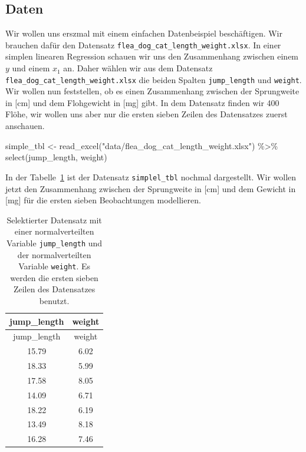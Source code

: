 \documentclass[
  letterpaper,
]{scrbook}
\newenvironment{Shaded}{\begin{snugshade}}{\end{snugshade}}
\newcommand{\FunctionTok}[1]{\textcolor[rgb]{0.28,0.35,0.67}{#1}}
\newcommand{\NormalTok}[1]{\textcolor[rgb]{0.00,0.23,0.31}{#1}}
\newcommand{\OtherTok}[1]{\textcolor[rgb]{0.00,0.23,0.31}{#1}}
\newcommand{\SpecialCharTok}[1]{\textcolor[rgb]{0.37,0.37,0.37}{#1}}
\newcommand{\StringTok}[1]{\textcolor[rgb]{0.13,0.47,0.30}{#1}}
\begin{document}
\hypertarget{daten-7}{%
\subsection{Daten}\label{daten-7}}

Wir wollen uns erszmal mit einem einfachen Datenbeispiel beschäftigen.
Wir brauchen dafür den Datensatz
\texttt{flea\_dog\_cat\_length\_weight.xlsx}. In einer simplen linearen
Regression schauen wir uns den Zusammenhang zwischen einem \(y\) und
einem \(x_1\) an. Daher wählen wir aus dem Datensatz
\texttt{flea\_dog\_cat\_length\_weight.xlsx} die beiden Spalten
\texttt{jump\_length} und \texttt{weight}. Wir wollen nun feststellen,
ob es einen Zusammenhang zwischen der Sprungweite in {[}cm{]} und dem
Flohgewicht in {[}mg{]} gibt. In dem Datensatz finden wir 400 Flöhe, wir
wollen uns aber nur die ersten sieben Zeilen des Datensatzes zuerst
anschauen.

\begin{Shaded}
\begin{Highlighting}[]
\NormalTok{simple\_tbl }\OtherTok{\textless{}{-}} \FunctionTok{read\_excel}\NormalTok{(}\StringTok{"data/flea\_dog\_cat\_length\_weight.xlsx"}\NormalTok{) }\SpecialCharTok{\%\textgreater{}\%}
  \FunctionTok{select}\NormalTok{(jump\_length, weight) }
\end{Highlighting}
\end{Shaded}

In der Tabelle~\ref{tbl-model-1} ist der Datensatz \texttt{simplel\_tbl}
nochmal dargestellt. Wir wollen jetzt den Zusammenhang zwischen der
Sprungweite in {[}cm{]} und dem Gewicht in {[}mg{]} für die ersten
sieben Beobachtungen modellieren.

\hypertarget{tbl-model-1}{}
\begin{longtable}[]{@{}cc@{}}
\caption{\label{tbl-model-1}Selektierter Datensatz mit einer
normalverteilten Variable \texttt{jump\_length} und der normalverteilten
Variable \texttt{weight}. Es werden die ersten sieben Zeilen des
Datensatzes benutzt.}\tabularnewline
\toprule()
jump\_length & weight \\
\midrule()
\endfirsthead
\toprule()
jump\_length & weight \\
\midrule()
\endhead
15.79 & 6.02 \\
18.33 & 5.99 \\
17.58 & 8.05 \\
14.09 & 6.71 \\
18.22 & 6.19 \\
13.49 & 8.18 \\
16.28 & 7.46 \\
\bottomrule()
\end{longtable}
\end{document}
